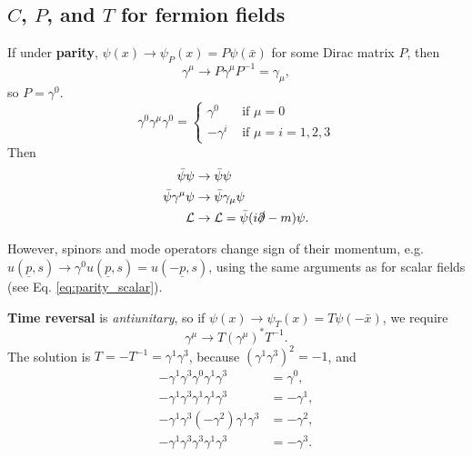 \documentclass{article}
\numberwithin{equation}{section}
\begin{document}
\subsection{$C$, $P$, and $T$ for fermion fields}

If under \textbf{parity}, $\psi(x) \rightarrow \psi_P(x) = P\psi(\bar{x})$ for some Dirac matrix $P$, then 
\begin{equation}
    \gamma^\mu \rightarrow P \gamma^\mu P^{-1} = \gamma_\mu,
\end{equation}
so $P = \gamma^0$.
\begin{equation}
    \gamma^0 \gamma^\mu \gamma^0=\left\{\begin{array}{cl}
        \gamma^0 & \text { if } \mu=0 \\
        -\gamma^i & \text { if } \mu=i=1,2,3
        \end{array}\right.
\end{equation}
Then
\begin{equation}
\begin{aligned}
    \bar{\psi}\psi &\rightarrow \bar{\psi} \psi \\
    \bar{\psi}\gamma^\mu \psi & \rightarrow \bar{\psi}\gamma_\mu \psi \\
    \mathcal{L} &\rightarrow \mathcal{L} = \bar{\psi}(i\slashed{\partial}-m)\psi.
\end{aligned}
\end{equation}

However, spinors and mode operators change sign of their momentum, e.g. $u(\underline{p}, s) \rightarrow \gamma^0u(\underline{p}, s) = u(-\underline{p}, s)$, using the same arguments as for scalar fields (see Eq. \ref{eq:parity_scalar}).

\textbf{Time reversal} is \textit{antiunitary}, so if $\psi(x) \rightarrow \psi_T(x) = T\psi(-\bar{x})$, we require
\begin{equation}
    \gamma^\mu \rightarrow T(\gamma^\mu)^* T^{-1}.
\end{equation}
The solution is $T = -T^{-1} = \gamma^1\gamma^3$, because $(\gamma^1\gamma^3)^2 = -1$, and 
\begin{equation}
    \begin{aligned}
        -\gamma^1 \gamma^3 \gamma^0 \gamma^1 \gamma^3 &=\gamma^0, \\
        -\gamma^1 \gamma^3 \gamma^1 \gamma^1 \gamma^3 &=-\gamma^1, \\
        -\gamma^1 \gamma^3\left(-\gamma^2\right) \gamma^1 \gamma^3 &=-\gamma^2, \\
        -\gamma^1 \gamma^3 \gamma^3 \gamma^1 \gamma^3 &=-\gamma^3.
        \end{aligned}
\end{equation}
\end{document}
